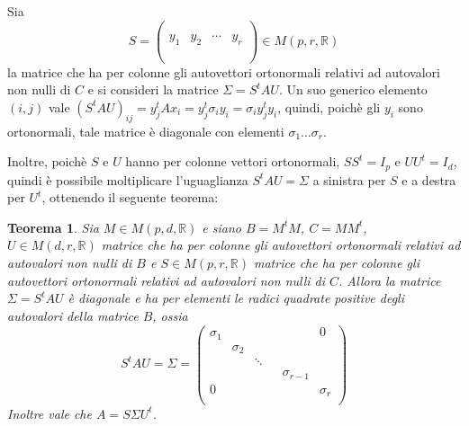 \documentclass[12pt,a4paper]{article}
\theoremstyle{thm}
\newtheorem{theorem}{Teorema}[section]
\theoremstyle{def}
\begin{document}
\vspace{0.5cm}

Sia $$S = \left(\begin{array}{c|c|c|c} & & & \\ & & & \\ y_1 & y_2 & \cdots& y_r\\ & & & \\ & & & \\ \end{array}\right) \in M(p,r, \mathds{R})$$ la matrice che ha per colonne gli autovettori ortonormali relativi ad autovalori non nulli di $C$ e si consideri la matrice $\Sigma=S^tAU$. Un suo generico elemento $(i, j)$ vale $(S^tAU)_{ij} = y_j^tAx_i = y_j^t \sigma_i y_i = \sigma_i y_j^t y_i$, quindi, poichè gli $y_i$ sono ortonormali, tale matrice è diagonale con elementi $\sigma_1\dots\sigma_r$.

Inoltre, poichè $S$ e $U$ hanno per colonne vettori ortonormali, $SS^t = I_p$ e $UU^t = I_d$, quindi è possibile moltiplicare l'uguaglianza $S^tAU = \Sigma$ a sinistra per $S$ e a destra per $U^t$, ottenendo il seguente teorema:


\begin{theorem}
Sia $M \in M(p,d, \mathds{R})$ e siano $B = M^tM$, $C = MM^t$, $U \in M (d, r, \mathds{R})$ matrice che ha per colonne gli autovettori ortonormali relativi ad autovalori non nulli di $B$ e $S \in M(p,r, \mathds{R})$ matrice che ha per colonne gli autovettori ortonormali relativi ad autovalori non nulli di $C$. Allora la matrice $\Sigma = S^tAU$ è diagonale e ha per elementi le radici quadrate positive degli autovalori della matrice $B$, ossia
\[
S^tAU = \Sigma = \begin{pmatrix} \sigma_1 & & & & & 0 \\ & \sigma_2 & & & & \\ & & \ddots & & & \\ & & & & \sigma_{r-1} & \\ 0 & & & & & \sigma_r \\ \end{pmatrix}
\]
Inoltre vale che $A = S \Sigma U^t$.
\end{theorem}



\end{document}

